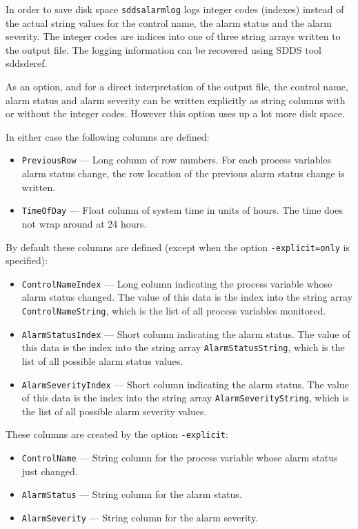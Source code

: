 \begin{itemize}
\begin{itemize}
In order to save disk space {\tt sddsalarmlog} logs integer codes
(indexes) instead of the actual string values for the control name,
the alarm status and the alarm severity. The integer codes are indices
into one of three string arrays written to the output file. The logging information
can be recovered using SDDS tool sddsderef. 

As an option, and for a direct interpretation of the output file, the control
name, alarm status and alarm severity can be written explicitly as
string columns with or without the integer codes. However this
option uses up a lot more disk space.

In either case the following columns are defined:
\begin{itemize}
        \item {\tt PreviousRow} --- Long column of row numbers. For each 
        process variables alarm status change, the row location of the 
        previous alarm status change is written.                
        \item {\tt TimeOfDay} --- Float column of system time in units of hours. 
        The time does not wrap around at 24 hours.
\end{itemize}

By default these columns are defined (except when the option {\tt -explicit=only} is specified):
\begin{itemize}
        \item {\tt ControlNameIndex} --- Long column indicating the process variable whose
        alarm status changed. The value of this data is the index into the string array 
        {\tt ControlNameString}, which is the list of all process variables monitored.
        \item {\tt AlarmStatusIndex} --- Short column indicating the alarm status.
         The value of this data is the index into the string array 
        {\tt AlarmStatusString}, which is the list of all possible alarm status values.
        \item {\tt AlarmSeverityIndex} --- Short column indicating the alarm status.
        The value of this data is the index into the string array 
        {\tt AlarmSeverityString}, which is the list of all possible alarm severity values.
\end{itemize}

These columns are created by the option {\tt -explicit}:
\begin{itemize}
        \item {\tt ControlName} --- String column for the process variable whose alarm
        status just changed.
        \item {\tt AlarmStatus} --- String column for the alarm status. 
        \item {\tt AlarmSeverity} --- String column for the alarm severity. 
\end{itemize}


\end{itemize}
\end{itemize}
